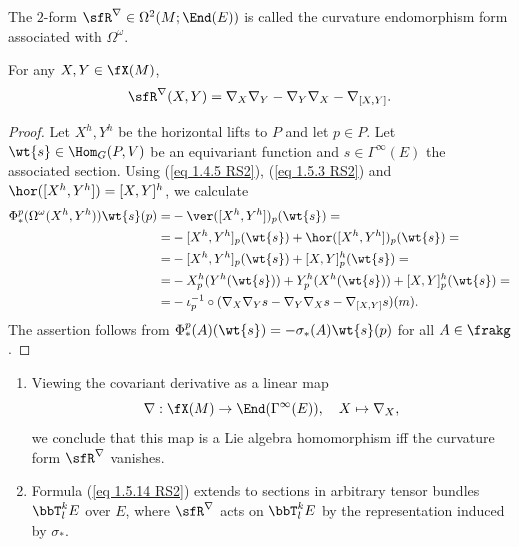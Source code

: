 \begin{defn}\label{def curvature endomorphism}
    The $2$-form $\sfR^\nabla\in\Omega^2(M;\End(E))$ is called the curvature endomorphism form associated with $\Omega^\omega$.
\end{defn}

\begin{prop}[{{\cite[Prop.~1.5.11]{RS2}}}]\label{prop 1.5.11 RS2}
    For any $X,Y\in\fX(M)$,
    \[\sfR^\nabla(X,Y)=\nabla_X\nabla_Y-\nabla_Y\nabla_X-\nabla_{[X,Y]}.\label{eq 1.5.14 RS2}\]
\end{prop}
\begin{proof}
    Let $X^h,Y^h$ be the horizontal lifts to $P$ and let $p\in P$. Let $\wt{s}\in \Hom_G(P,V)$ be an equivariant function and $s\in\Gamma^\infty(E)$ the associated section. Using (\ref{eq 1.4.5 RS2}), (\ref{eq 1.5.3 RS2}) and $\hor([X^h,Y^h])=[X,Y]^h$, we calculate
    \begin{align}
        \Phi^p_\ast(\Omega^\omega(X^h,Y^h))\wt{s}(p)=&-\ver([X^h,Y^h])_p(\wt{s})=\\
        =&-[X^h,Y^h]_p(\wt{s})+\hor([X^h,Y^h])_p(\wt{s})=\\
        =&-[X^h,Y^h]_p(\wt{s})+[X,Y]^h_p(\wt{s})=\\
        =&-X^h_p(Y^h(\wt{s}))+Y^h_p(X^h(\wt{s}))+[X,Y]_p^h(\wt{s})=\\
        =&-\iota_p^{-1}\circ (\nabla_X\nabla_Y s-\nabla_Y \nabla_X s-\nabla_{[X,Y]}s)(m).
    \end{align}
    The assertion follows from $\Phi^p_\ast(A)(\wt{s})=-\sigma_\ast(A)\wt{s}(p)$ for all $A\in\frakg$.
\end{proof}


\begin{rem}\label{rem 1.5.12 RS2}
    \begin{enumerate}
        \item Viewing the covariant derivative as a linear map
        \[\nabla:\fX(M)\to \End(\Gamma^\infty(E)),\quad X\mapsto \nabla_X,\]
        we conclude that this map is a Lie algebra homomorphism iff the curvature form $\sfR^\nabla$ vanishes.
        \item Formula (\ref{eq 1.5.14 RS2}) extends to sections in arbitrary tensor bundles $\bbT^k_l E$ over $E$, where $\sfR^\nabla$ acts on $\bbT^k_l E$ by the representation induced by $\sigma_\ast$.
    \end{enumerate}
\end{rem}

